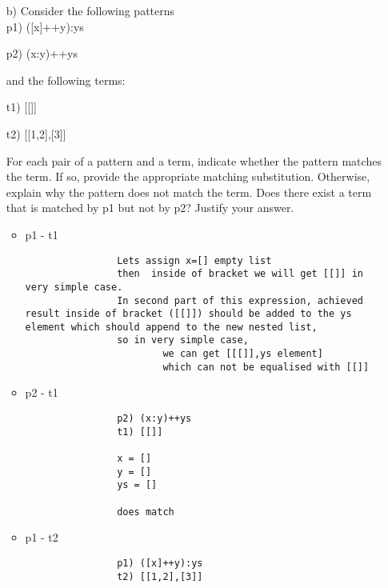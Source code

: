 \documentclass[10pt]{article}
\begin{document}
\begin{itemize}
	\item[b)] Consider the following patterns\\
	p1) ([x]++y):ys

	p2) (x:y)++ys

	and the following terms:

	t1) [[]]

	t2) [[1,2],[3]]

	For each pair of a pattern and a term, indicate whether the pattern matches the term. If so, provide the
appropriate matching substitution. Otherwise, explain why the pattern does not match the term.
Does there exist a term that is matched by p1 but not by p2? Justify your answer.
	
	\begin{paracol}{2}
		\begin{itemize}
			\item p1 - t1
			\begin{addmargin}[-5em]{-2em}
				\begin{lstlisting}
				Lets assign x=[] empty list
				then  inside of bracket we will get [[]] in very simple case.
				In second part of this expression, achieved result inside of bracket ([[]]) should be added to the ys element which should append to the new nested list,
				so in very simple case,
				        we can get [[[]],ys element] 
				        which can not be equalised with [[]]
				\end{lstlisting}
			\end{addmargin}
		\end{itemize}
	
		\switchcolumn
	
		\begin{itemize}
			\item p2 - t1
			\begin{addmargin}[-5em]{2em}
				\begin{lstlisting}
				p2) (x:y)++ys
				t1) [[]]
				
				x = []
				y = []
				ys = []
				
				does match
				\end{lstlisting}
			\end{addmargin}
		\end{itemize}
	
		
		\switchcolumn
		
		
		\begin{itemize}
			\item p1 - t2
			\begin{addmargin}[-5em]{2em}
				\begin{lstlisting}
				p1) ([x]++y):ys
				t2) [[1,2],[3]]
				

\end{lstlisting}
\end{addmargin}
\end{itemize}
\end{paracol}
\end{itemize}
\end{document}
